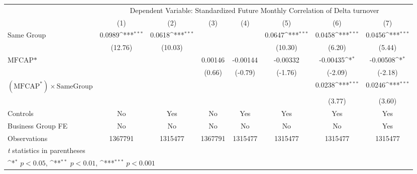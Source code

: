 {
\def\sym#1{\ifmmode^{#1}\else\(^{#1}\)\fi}
\begin{tabular}{l*{7}{c}}
\hline\hline
                &\multicolumn{7}{c}{Dependent Variable: Standardized Future Monthly Correlation of Delta turnover}                                   \\\cmidrule(lr){2-8}
                &\multicolumn{1}{c}{(1)}         &\multicolumn{1}{c}{(2)}         &\multicolumn{1}{c}{(3)}         &\multicolumn{1}{c}{(4)}         &\multicolumn{1}{c}{(5)}         &\multicolumn{1}{c}{(6)}         &\multicolumn{1}{c}{(7)}         \\
\hline
Same Group      &   0.0989\sym{***}&   0.0618\sym{***}&                  &                  &   0.0647\sym{***}&   0.0458\sym{***}&   0.0456\sym{***}\\
                &  (12.76)         &  (10.03)         &                  &                  &  (10.30)         &   (6.20)         &   (5.44)         \\
[1em]
$ \text{MFCAP*} $&                  &                  &  0.00146         & -0.00144         & -0.00332         & -0.00435\sym{*}  & -0.00508\sym{*}  \\
                &                  &                  &   (0.66)         &  (-0.79)         &  (-1.76)         &  (-2.09)         &  (-2.18)         \\
[1em]
 $ (\text{MFCAP}^*) \times {\text{SameGroup} }  $ &                  &                  &                  &                  &                  &   0.0238\sym{***}&   0.0246\sym{***}\\
                &                  &                  &                  &                  &                  &   (3.77)         &   (3.60)         \\
\hline
Controls        &       No         &      Yes         &       No         &      Yes         &      Yes         &      Yes         &      Yes         \\
Business Group FE&       No         &       No         &       No         &       No         &       No         &       No         &      Yes         \\
Observations    &  1367791         &  1315477         &  1367791         &  1315477         &  1315477         &  1315477         &  1315477         \\
\hline\hline
\multicolumn{8}{l}{\footnotesize \textit{t} statistics in parentheses}\\
\multicolumn{8}{l}{\footnotesize \sym{*} \(p<0.05\), \sym{**} \(p<0.01\), \sym{***} \(p<0.001\)}\\
\end{tabular}
}
